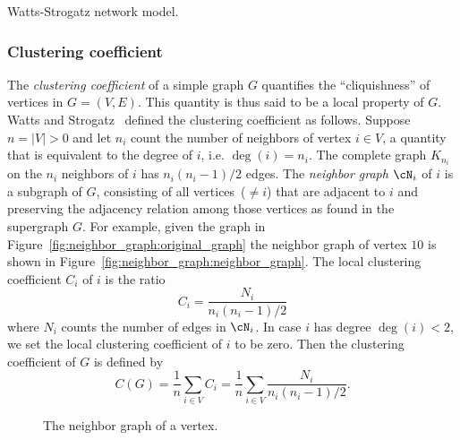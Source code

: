 \begin{algorithm}[!htbp]

\caption{Watts-Strogatz network model.}
\label{alg:random_graphs:generate_Watts_Strogatz_graph}
\end{algorithm}



\subsubsection{Clustering coefficient}

The \emph{clustering coefficient} of a
simple graph $G$ quantifies the ``cliquishness'' of vertices in
$G = (V,E)$. This quantity is thus said to be a local property of
$G$. Watts and Strogatz~\cite{WattsStrogatz1998} defined the
clustering coefficient as follows. Suppose $n = |V| > 0$ and let $n_i$
count the number of neighbors of vertex $i \in V$, a quantity that is
equivalent to the degree of $i$, i.e. $\deg(i) = n_i$. The complete
graph $K_{n_i}$ on the $n_i$ neighbors of $i$ has $n_i(n_i - 1) / 2$
edges. The \emph{neighbor graph} $\cN_i$ of $i$
is a subgraph of $G$, consisting of all vertices~($\neq i$) that are
adjacent to $i$ and preserving the adjacency relation among those
vertices as found in the supergraph $G$. For example, given the graph
in Figure~\ref{fig:neighbor_graph:original_graph} the neighbor graph
of vertex $10$ is shown in
Figure~\ref{fig:neighbor_graph:neighbor_graph}. The local clustering
coefficient $C_i$ of $i$ is the ratio
\[
C_i
=
\frac{N_i} {n_i (n_i - 1) / 2}
\]
where $N_i$ counts the number of edges in $\cN_i$. In case $i$ has
degree $\deg(i) < 2$, we set the local clustering coefficient of $i$
to be zero. Then the clustering
coefficient of $G$ is defined by
\[
C(G)
=
\frac{1}{n} \sum_{i \in V} C_i
=
\frac{1}{n} \sum_{i \in V} \frac{N_i} {n_i (n_i - 1) / 2}.
\]

\begin{figure}[!htbp]
\centering
{}

\caption{The neighbor graph of a vertex.}
\label{fig:random_graphs:neighbor_graph}
\end{figure}

